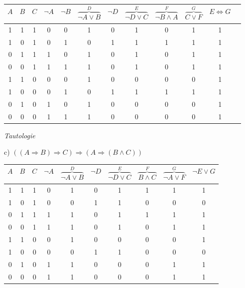 \begin{table}[h]
\centering
\begin{tabular}{c|c|c|c|c|c|c|c|c|c|c|c}
$A$ & $B$ & $C$ & $\lnot A$ & $\lnot B$ & $\overbrace{\lnot A \lor B}^{D}$ & $\lnot D$ & $\overbrace{\lnot D \lor C}^{E}$ & $\overbrace{\lnot B \land A}^{F}$ & $\overbrace{C \lor F}^{G}$ & $E \Leftrightarrow G$\\
\hline
1 & 1 & 1 & 0 & 0 & 1 & 0 & 1 & 0 & 1 & 1\\
1 & 0 & 1 & 0 & 1 & 0 & 1 & 1 & 1 & 1 & 1\\
0 & 1 & 1 & 1 & 0 & 1 & 0 & 1 & 0 & 1 & 1\\
0 & 0 & 1 & 1 & 1 & 1 & 0 & 1 & 0 & 1 & 1\\
1 & 1 & 0 & 0 & 0 & 1 & 0 & 0 & 0 & 0 & 1\\
1 & 0 & 0 & 0 & 1 & 0 & 1 & 1 & 1 & 1 & 1\\
0 & 1 & 0 & 1 & 0 & 1 & 0 & 0 & 0 & 0 & 1\\
0 & 0 & 0 & 1 & 1 & 1 & 0 & 0 & 0 & 0 & 1\\
\end{tabular}
\end{table}

\textit{Tautologie}\\

\newpage

c) $((A \Rightarrow B) \Rightarrow C) \Rightarrow (A \Rightarrow (B \land C))$\\

\begin{table}[h]
\centering
\begin{tabular}{c|c|c|c|c|c|c|c|c|c}
$A$ & $B$ & $C$ & $\lnot A$ & $\overbrace{\lnot A \lor B}^{D}$ & $\lnot D$ & $\overbrace{\lnot D \lor C}^{E}$ & $\overbrace{B \land C}^{F}$ & $\overbrace{\lnot A \lor F}^{G}$ & $\lnot E \lor G$\\
\hline
1 & 1 & 1 & 0 & 1 & 0 & 1 & 1 & 1 & 1\\
1 & 0 & 1 & 0 & 0 & 1 & 1 & 0 & 0 & 0\\
0 & 1 & 1 & 1 & 1 & 0 & 1 & 1 & 1 & 1\\
0 & 0 & 1 & 1 & 1 & 0 & 1 & 0 & 1 & 1\\
1 & 1 & 0 & 0 & 1 & 0 & 0 & 0 & 0 & 1\\
1 & 0 & 0 & 0 & 0 & 1 & 1 & 0 & 0 & 0\\
0 & 1 & 0 & 1 & 1 & 0 & 0 & 0 & 1 & 1\\
0 & 0 & 0 & 1 & 1 & 0 & 0 & 0 & 1 & 1\\
\end{tabular}
\end{table}

